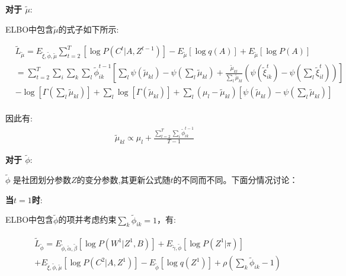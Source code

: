 \textbf{对于 $\widetilde{\mu}$}:

ELBO中包含$\widetilde{\mu}$的式子如下所示:

\begin{equation}
\begin{split}
& \widetilde{L}_{\widetilde{\mu}} = E_{\widetilde{\xi},\widetilde{\phi},\widetilde{\mu}} \sum_{t=2}^T [\log P(C^t|A,Z^{t-1})] 
- E_{\widetilde{\mu}}[\log q(A)]+ E_{\widetilde{\mu}}[\log P(A)]\\
&=\sum_{t=2}^T \sum_i \sum_k \sum_l \widetilde{\phi}_{ik}^{t-1} [\sum_l \psi(\widetilde{\mu}_{kl}) - \psi(\sum_l \widetilde{\mu}_{kl}) 
+ \frac{\widetilde{\mu}_{kl}}{\sum_l \widetilde{\mu}_{kl}}(\psi(\widetilde{\xi}_{ik}^t)-\psi(\sum_l \widetilde{\xi}_{il}^t))]  \\
&-\log[\Gamma(\sum_l \widetilde{\mu}_{kl})] + \sum_l \log[\Gamma(\widetilde{\mu}_{kl})]
+ \sum_l (\mu_l - \widetilde{\mu}_{kl})[\psi(\widetilde{\mu}_{kl}) - \psi(\sum_l \widetilde{\mu}_{kl})]  \\
\end{split}
\end{equation}

因此有:
\begin{equation}
\label{eq7}
\begin{split}
\widetilde{\mu}_{kl} \propto \mu_l + \frac{\sum_{t=2}^T \sum_i \widetilde{\phi}_{ik}^{t-1}}{T-1}
\end{split}
\end{equation}

\textbf{对于 $\widetilde{\phi}$}:

$\widetilde{\phi}$ 是社团划分参数$Z$的变分参数,其更新公式随$t$的不同而不同。下面分情况讨论：

\textbf{当$t=1$时}:

ELBO中包含$\widetilde{\phi}$的项并考虑约束$\sum_k \widetilde{\phi}_{ik} = 1$，有:

\begin{equation}
\begin{split}
&\widetilde{L}_{\widetilde{\phi}} = E_{\widetilde{\phi},\widetilde{\alpha},\widetilde{\beta}} [\log P(W^1|Z^1,B)] + E_{\widetilde{\gamma},\widetilde{\phi}}[\log P(Z^1|\pi)] \\
&+ E_{\widetilde{\xi},\widetilde{\phi},\widetilde{\mu}}[\log P(C^2|A,Z^1)] - E_{\widetilde{\phi}}[\log q(Z^1)]+\rho (\sum_k \widetilde{\phi}_{ik}-1)\\
\end{split}
\end{equation}

